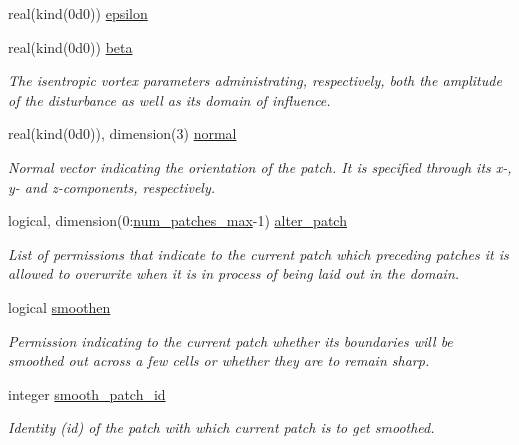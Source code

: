 \begin{DoxyCompactItemize}
real(kind(0d0)) \hyperlink{structm__derived__types_1_1ic__patch__parameters_aad687270554f90c1520e97a5c2dcc4e8}{epsilon}
\item 
real(kind(0d0)) \hyperlink{structm__derived__types_1_1ic__patch__parameters_a11c5827ce1fa54cadd2996c9ccd2fe31}{beta}
\begin{DoxyCompactList}\small\item\em The isentropic vortex parameters administrating, respectively, both the amplitude of the disturbance as well as its domain of influence. \end{DoxyCompactList}\item 
real(kind(0d0)), dimension(3) \hyperlink{structm__derived__types_1_1ic__patch__parameters_a04e1c26cca4a4ef9ef9f1ae54c01a61c}{normal}
\begin{DoxyCompactList}\small\item\em Normal vector indicating the orientation of the patch. It is specified through its x-\/, y-\/ and z-\/components, respectively. \end{DoxyCompactList}\item 
logical, dimension(0\+:\hyperlink{namespacem__derived__types_a0e61503f10c4338737b8d61e9109e396}{num\+\_\+patches\+\_\+max}-\/1) \hyperlink{structm__derived__types_1_1ic__patch__parameters_af75434fb4f9966ac0cbc54e50a42f1c6}{alter\+\_\+patch}
\begin{DoxyCompactList}\small\item\em List of permissions that indicate to the current patch which preceding patches it is allowed to overwrite when it is in process of being laid out in the domain. \end{DoxyCompactList}\item 
logical \hyperlink{structm__derived__types_1_1ic__patch__parameters_a14ab0ad536844406d181e43519aa3ec0}{smoothen}
\begin{DoxyCompactList}\small\item\em Permission indicating to the current patch whether its boundaries will be smoothed out across a few cells or whether they are to remain sharp. \end{DoxyCompactList}\item 
integer \hyperlink{structm__derived__types_1_1ic__patch__parameters_a1e1bb0d754aa7f3eaf43204794f18e05}{smooth\+\_\+patch\+\_\+id}
\begin{DoxyCompactList}\small\item\em Identity (id) of the patch with which current patch is to get smoothed. \end{DoxyCompactList}\item 

\end{DoxyCompactItemize}
